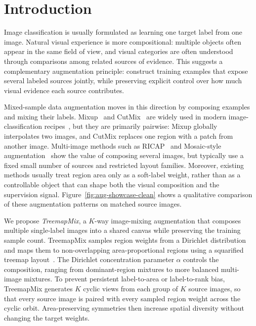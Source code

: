 \section{Introduction}

Image classification is usually formulated as learning one target label from one
image. Natural visual experience is more compositional: multiple objects often
appear in the same field of view, and visual categories are often understood
through comparisons among related sources of evidence. This suggests a
complementary augmentation principle: construct training examples that expose
several labeled sources jointly, while preserving explicit control over how much
visual evidence each source contributes.

Mixed-sample data augmentation moves in this direction by composing examples
and mixing their labels. Mixup~\citep{mixup} and CutMix~\citep{cutmix} are
widely used in modern image-classification recipes~\citep{
wightmanResNetStrikesBack2021,pmlr-v139-touvron21a,
touvronDeiTIIIRevenge2022,liOpenMixupOpenMixup2024}, but they are primarily
pairwise: Mixup globally interpolates two images, and CutMix replaces one
region with a patch from another image. Multi-image methods such as
RICAP~\citep{takahashiDataAugmentationUsing2020} and Mosaic-style
augmentation~\citep{bochkovskiyYOLOv4OptimalSpeed2020} show the value of
composing several images, but typically use a fixed small number of sources and
restricted layout families. Moreover, existing methods usually treat region
area only as a soft-label weight, rather than as a controllable object that can
shape both the visual composition and the supervision signal. Figure~\ref{fig:aug-showcase-clean}
shows a qualitative comparison of these augmentation patterns on matched source
images.



We propose \emph{TreemapMix}, a $K$-way image-mixing augmentation that composes
multiple single-label images into a shared canvas while preserving the training
sample count. TreemapMix samples region weights from a Dirichlet distribution
and maps them to non-overlapping area-proportional regions using a squarified
treemap layout~\citep{squarifiedtreemap}. The Dirichlet concentration
parameter $\alpha$ controls the composition, ranging from dominant-region
mixtures to more balanced multi-image mixtures. To prevent persistent
label-to-area or label-to-rank bias, TreemapMix generates $K$ cyclic views from
each group of $K$ source images, so that every source image is paired with every
sampled region weight across the cyclic orbit. Area-preserving symmetries then
increase spatial diversity without changing the target weights.

